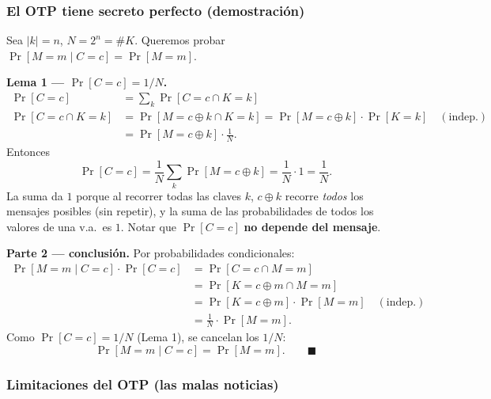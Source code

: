 \documentclass[../main.tex]{subfiles}
\begin{document}

\subsubsection{El OTP tiene secreto perfecto (demostración)}

Sea $|k|=n$, $N=2^n=\#K$. Queremos probar $\Pr[M{=}m\mid C{=}c]=\Pr[M{=}m]$.

\textbf{Lema 1 — $\Pr[C{=}c]=1/N$.}
\begin{align*}
\Pr[C{=}c] &= \sum_k \Pr[C{=}c \cap K{=}k]\\
\Pr[C{=}c \cap K{=}k] &= \Pr[M{=}c\oplus k \cap K{=}k]
   = \Pr[M{=}c\oplus k]\cdot \Pr[K{=}k] \quad(\text{indep.})\\
   &= \Pr[M{=}c\oplus k]\cdot \tfrac{1}{N}.
\end{align*}
Entonces
$$\Pr[C{=}c] = \frac{1}{N}\sum_k \Pr[M{=}c\oplus k] = \frac{1}{N}\cdot 1 = \frac{1}{N}.$$
La suma da $1$ porque al recorrer todas las claves $k$, $c\oplus k$ recorre
\emph{todos} los mensajes posibles (sin repetir), y la suma de las
probabilidades de todos los valores de una v.a.\ es $1$. Notar que $\Pr[C{=}c]$
\textbf{no depende del mensaje}.

\textbf{Parte 2 — conclusión.} Por probabilidades condicionales:
\begin{align*}
\Pr[M{=}m\mid C{=}c]\cdot \Pr[C{=}c] &= \Pr[C{=}c \cap M{=}m]\\
&= \Pr[K{=}c\oplus m \cap M{=}m]\\
&= \Pr[K{=}c\oplus m]\cdot \Pr[M{=}m] \quad(\text{indep.})\\
&= \tfrac{1}{N}\cdot \Pr[M{=}m].
\end{align*}
Como $\Pr[C{=}c]=1/N$ (Lema 1), se cancelan los $1/N$:
$$\boxed{\Pr[M{=}m\mid C{=}c] = \Pr[M{=}m].}\qquad\blacksquare$$

\subsubsection{Limitaciones del OTP (las malas noticias)}
\end{document}

